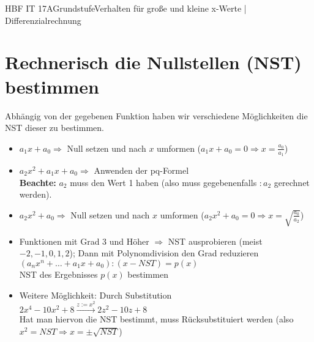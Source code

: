 \documentclass[11pt,twocolumn,oneside,openany,headings=optiontotoc,11pt,numbers=noenddot]{article}
\begin{document}
\begin{worksheet}{HBF IT 17A}{Grundstufe}{Verhalten für große und kleine x-Werte | Differenzialrechnung}
		\section{Rechnerisch die Nullstellen (NST) bestimmen}
		Abhängig von der gegebenen Funktion haben wir verschiedene Möglichkeiten die NST dieser zu bestimmen.
		\begin{itemize}
			\item \(a_1x + a_0 \Rightarrow\) Null setzen und nach \(x\) umformen (\(a_1x + a_0 = 0 \Rightarrow x = \frac{a_0}{a_1}\))
			\item  \(a_2x^2 + a_1x + a_0 \Rightarrow\) Anwenden der pq-Formel\\
			\textbf{Beachte:} \(a_2\) muss den Wert 1 haben (also muss gegebenenfalls \(:a_2\) gerechnet werden).
			\item \(a_2x^2 + a_0 \Rightarrow\) Null setzen und nach \(x\) umformen (\(a_2x^2 + a_0 = 0 \Rightarrow x = \sqrt{\frac{a_0}{a_2}}\))
			\item Funktionen mit Grad 3 und Höher \(\Rightarrow\) NST ausprobieren (meist \(-2,-1,0,1,2\)); Dann mit Polynomdivision den Grad reduzieren\\
			\((a_nx^n + \ldots +a_1x +a_0):(x-NST) = p(x)\)\\
			NST des Ergebnisses \(p(x)\) bestimmen
			\item Weitere Möglichkeit: Durch Substitution\\
			\(2x^4 -10x^2+8 \xrightarrow{z:=x^2} 2z^2-10z+8\)\\
			Hat man hiervon die NST bestimmt, muss Rücksubstituiert werden (also \(x^2 = NST \Rightarrow x = \pm \sqrt{NST}\))
		\end{itemize}

\end{worksheet}
\end{document}
